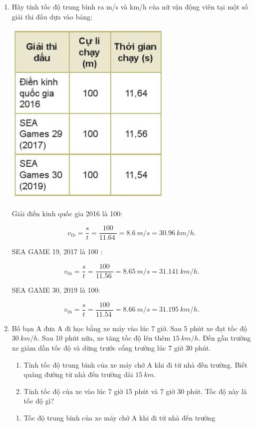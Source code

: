 \begin{enumerate}[label=\bfseries Câu \arabic*:]
			\item {}
		
		
		{
		Hãy tính tốc độ trung bình ra m/s và km/h của nữ vận động viên tại một số giải thi đấu dựa vào bảng:
		\begin{center}
			\includegraphics[scale=1]{../figs/VN10-2022-PH-TP005-5.jpg}
		\end{center}
		}
		\hideall
		{
		
			Giải điền kinh quốc  gia 2016 là 100:
			
			$$v_\text{tb} = \dfrac{s}{t} =\dfrac{100}{\SI{11,64}{}} = \SI{8,6}{m/s} = \SI{30,96}{km/h}.$$
			
			SEA GAME 19, 2017  là 100 : 
			
			$$v_\text{tb} = \dfrac{s}{t} =\dfrac{100}{\SI{11,56}{}} = \SI{8,65}{m/s} = \SI{31,141}{km/h}.$$
			
			SEA GAME 30, 2019 là 100: 
			
			$$v_\text{tb} = \dfrac{s}{t} =\dfrac{100}{\SI{11,54}{}}= \SI{8,66}{m/s} = \SI{31,195}{km/h}.$$
		}
		\item {}
	
	
	{Bố bạn A đưa A đi học bằng xe máy vào lúc 7 giờ. Sau 5 phút xe đạt tốc độ $\SI{30}{km/h}$. Sau 10 phút nữa, xe tăng tốc độ lên thêm $\SI{15}{km/h}$. Đến gần trường xe giảm dần tốc độ và dừng trước cổng trường lúc 7 giờ 30 phút.
		\begin{enumerate}[label=\alph*)]
			\item Tính tốc độ trung bình của xe máy chở A khi đi từ nhà đến trường. Biết quãng đường từ nhà đến trường dài $\SI{15}{km}.$
			\item Tính tốc độ của xe vào lúc 7 giờ 15 phút và 7 giờ 30 phút. Tốc độ này là tốc độ gì?
		\end{enumerate}
	}
	\hideall
	{
		\begin{enumerate}[label=\alph*)]
			\item Tốc độ trung bình của xe máy chở A khi đi từ nhà đến trường
			

\end{enumerate}}
\end{enumerate}
